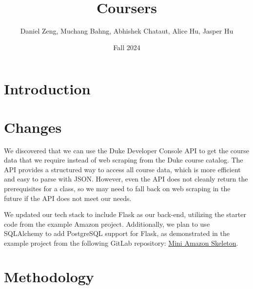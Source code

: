 \documentclass{article}
\begin{document}
\title{Coursers}
\author{Daniel Zeng, Muchang Bahng, Abhishek Chataut, Alice Hu, Jasper Hu}
\date{Fall 2024}

\maketitle

\section{Introduction} 

\section{Changes}
We discovered that we can use the Duke Developer Console API to get the course data that we require instead of web scraping from the Duke course catalog. The API provides a structured way to access all course data, which is more efficient and easy to parse with JSON. However, even the API does not cleanly return the prerequisites for a class, so we may need to fall back on web scraping in the future if the API does not meet our needs.

We updated our tech stack to include Flask as our back-end, utilizing the starter code from the example Amazon project. Additionally, we plan to use SQLAlchemy to add PostgreSQL support for Flask, as demonstrated in the example project from the following GitLab repository: \href{https://gitlab.oit.duke.edu/compsci316/mini-amazon-skeleton-24-fall/-/tree/main?ref_type=heads}{Mini Amazon Skeleton}.


\section{Methodology}
\end{document}
